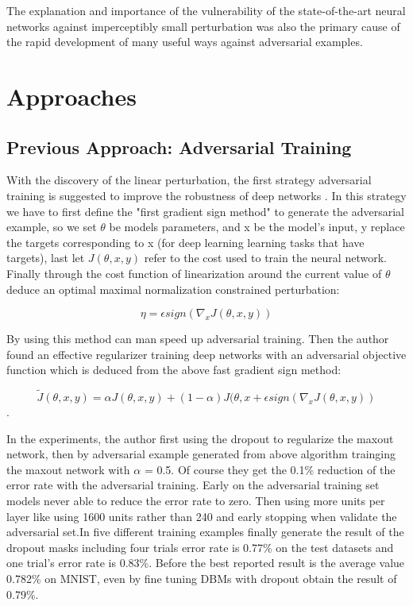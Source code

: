 The explanation and importance of the vulnerability of the state-of-the-art neural networks against imperceptibly small perturbation was also the primary cause of the rapid development of many useful ways against adversarial examples.

\chapter{Approaches}
\section{Previous Approach: Adversarial Training}

With the discovery of the linear perturbation, the first strategy adversarial training is suggested to improve the robustness of deep networks \cite{goodfellow2014explaining}. In this strategy we have to first define the "first gradient sign method" to generate the adversarial example, so we set $\theta$ be models parameters, and x be the model's input, y replace the targets corresponding to x (for deep learning learning tasks that have targets), last let $J(\theta, x, y)$ refer to the cost used to train the neural network. Finally through the cost function of linearization around the current value of $\theta$ deduce an optimal maximal normalization constrained perturbation:  

$$\eta = \epsilon sign(\nabla_x J(\theta,x,y))$$  

By using this method can man speed up adversarial training. Then the author found an effective regularizer training deep networks with an adversarial objective function which is deduced from the above fast gradient sign method:

$$ \tilde J(\theta,x,y) = \alpha J(\theta,x,y) + (1 - \alpha)J(\theta,x + \epsilon sign(\nabla_xJ(\theta,x,y))$$.

In the experiments, the author first using the dropout to regularize the maxout network, then by adversarial example generated from above algorithm trainging the maxout network with $\alpha$ = 0.5. Of course they get the 0.1\% reduction of the error rate with the adversarial training. Early on the adversarial training set models never able to reduce the error rate to zero. Then using more units per layer like using 1600 units rather than 240 and early stopping when validate the adversarial set.In five different training examples finally generate the result of the dropout masks including four trials error rate is 0.77\% on the test datasets and one trial's error rate is 0.83\%. Before the best reported result is the average value 0.782\% on MNIST, even by fine tuning DBMs with dropout obtain the result of 0.79\%.
 
